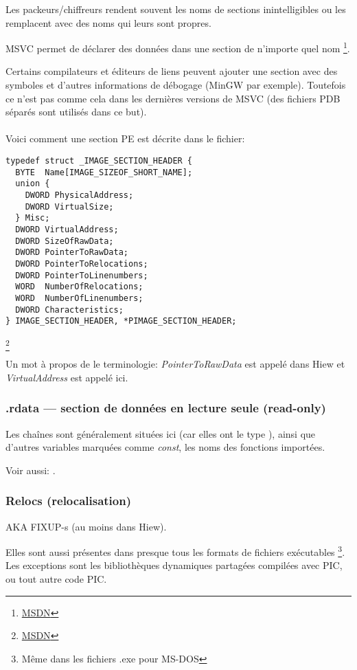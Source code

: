 Les packeurs/chiffreurs rendent souvent les noms de sections inintelligibles ou les
remplacent avec des noms qui leurs sont propres.

\ac{MSVC} permet de déclarer des données dans une section de n'importe quel nom
\footnote{\href{http://go.yurichev.com/17047}{MSDN}}.

Certains compilateurs et éditeurs de liens peuvent ajouter une section avec des symboles
et d'autres informations de débogage (MinGW par exemple).
Toutefois ce n'est pas comme cela dans les dernières versions de \ac{MSVC} (des fichiers
\gls{PDB} séparés sont utilisés dans ce but).\\
\\
Voici comment une section PE est décrite dans le fichier:

\begin{lstlisting}
typedef struct _IMAGE_SECTION_HEADER {
  BYTE  Name[IMAGE_SIZEOF_SHORT_NAME];
  union {
    DWORD PhysicalAddress;
    DWORD VirtualSize;
  } Misc;
  DWORD VirtualAddress;
  DWORD SizeOfRawData;
  DWORD PointerToRawData;
  DWORD PointerToRelocations;
  DWORD PointerToLinenumbers;
  WORD  NumberOfRelocations;
  WORD  NumberOfLinenumbers;
  DWORD Characteristics;
} IMAGE_SECTION_HEADER, *PIMAGE_SECTION_HEADER;
\end{lstlisting}
\footnote{\href{http://go.yurichev.com/17048}{MSDN}}

Un mot à propos de le terminologie: \emph{PointerToRawData} est appelé  dans
Hiew et \emph{VirtualAddress} est appelé  ici.

\subsubsection{.rdata --- section de données en lecture seule (read-only)}

Les chaînes sont généralement situées ici (car elles ont le type ),
ainsi que d'autres variables marquées comme \emph{const}, les noms des fonctions
importées.

Voir aussi: .

\subsubsection{Relocs (relocalisation)}
\label{subsec:relocs}

\ac{AKA} FIXUP-s (au moins dans Hiew).

Elles sont aussi présentes dans presque tous les formats de fichiers exécutables
\footnote{Même dans les fichiers .exe pour MS-DOS}.
Les exceptions sont les bibliothèques dynamiques partagées compilées avec \ac{PIC},
ou tout autre code \ac{PIC}.

